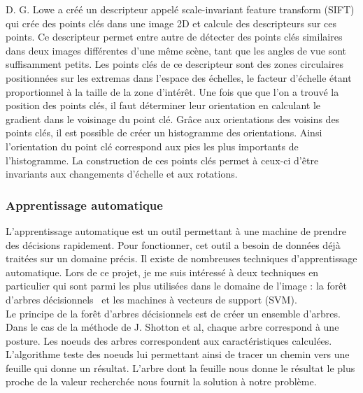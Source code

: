 D. G. Lowe\cite{SIFT} a créé un descripteur appelé \og scale-invariant feature transform \fg(SIFT) qui crée
des points clés dans une image 2D et calcule des descripteurs sur ces points. Ce descripteur permet entre autre
de détecter des points clés similaires dans deux images différentes d'une même scène, tant que les angles de vue
sont suffisamment petits. Les points clés de ce descripteur sont des zones circulaires positionnées sur les extremas 
dans l'espace des échelles, le facteur d'échelle étant proportionnel à la taille de la zone d'intérêt. Une fois que
que l'on a trouvé la position des points clés, il faut déterminer leur orientation en calculant le gradient dans le voisinage
du point clé. Grâce aux orientations des voisins des points clés, il est possible de créer un histogramme des orientations. Ainsi
l'orientation du point clé correspond aux pics les plus importants de l'histogramme.
La construction de ces points clés permet à ceux-ci d'être invariants aux changements d'échelle et aux rotations.

\subsubsection{Apprentissage automatique}
L'apprentissage automatique est un outil permettant à une machine de prendre des décisions rapidement.
Pour fonctionner, cet outil a besoin de données déjà traitées sur un domaine précis. Il existe de nombreuses
techniques d'apprentissage automatique. Lors de ce projet, je me suis intéressé à deux techniques en 
particulier qui sont parmi les plus utilisées dans le domaine de l'image : la \og forêt d'arbres décisionnels \fg \ et les
\og machines à vecteurs de support \fg (SVM).\\

Le principe de la forêt d'arbres décisionnels\cite{randomDecisionForest} est de créer un ensemble d'arbres.
Dans le cas de la méthode de J. Shotton et al\cite{kinectSegmentation}, chaque arbre correspond à une posture.
Les noeuds des arbres correspondent aux caractéristiques calculées. L'algorithme teste des noeuds lui permettant ainsi de tracer un
chemin vers une feuille qui donne un résultat. L'arbre dont la feuille nous donne le résultat le plus proche 
de la valeur recherchée nous fournit la solution à notre problème.\\

